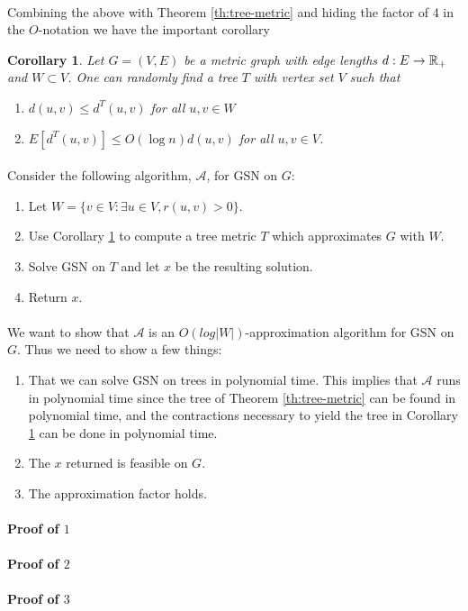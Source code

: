 \documentclass[letterpaper,12pt,oneside,onecolumn]{article}
\newcommand{\cA}{\mathcal{A}} \newcommand{\cB}{\mathcal{B}}
\newtheorem{corollary}[fact]{Corollary}
\begin{document}
\paragraph{}
Combining the above with Theorem \ref{th:tree-metric} and hiding the factor of $4$ in the $O$-notation we have the important corollary
\begin{corollary}\label{cor:tree-metric}
Let $G = (V,E)$ be a metric graph with edge lengths $d:E\rightarrow \mathbb{R}_+$ and $W \subset V$. One can randomly find a tree $T$ with vertex set $V$ such that
\begin{enumerate}
\item $d(u,v) \leq d^T(u,v)$ for all $u,v\in W$
\item $E[d^T(u,v)] \leq O(\log n) d(u,v)$ for all $u,v\in V$.
\end{enumerate}
\end{corollary}
\paragraph{}
Consider the following algorithm, $\cA$, for GSN on $G$:
\begin{enumerate}
\item Let $W = \{v \in V: \exists u \in V, r(u,v) > 0\}$.
\item Use Corollary \ref{cor:tree-metric} to compute a tree metric $T$ which approximates $G$ with $W$.
\item Solve GSN on $T$ and let $x$ be the resulting solution.
\item Return $x$.
\end{enumerate}
\paragraph{}
We want to show that $\cA$ is an $O(log |W|)$-approximation algorithm for GSN on $G$. Thus we need to show a few things:
\begin{enumerate}
\item That we can solve GSN on trees in polynomial time. This implies that $\cA$ runs in polynomial time since the tree of Theorem \ref{th:tree-metric} can be found in polynomial time, and the contractions necessary to yield the tree in Corollary \ref{cor:tree-metric} can be done in polynomial time. 
\item The $x$ returned is feasible on $G$.
\item The approximation factor holds.
\end{enumerate}
\paragraph{Proof of $1$}

\paragraph{Proof of $2$}

\paragraph{Proof of $3$}
\end{document}
